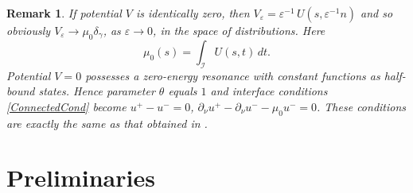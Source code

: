 \documentclass[reqno]{amsart}
\theoremstyle{plain}
\newtheorem{rem}{Remark}
\numberwithin{equation}{section}
\newcommand{\eps}{\varepsilon}
\newcommand{\cI}{\mathcal{I}}
\begin{document}
\begin{rem}
  If potential $V$ is identically zero, then $V_\eps=\eps^{-1}\,U\left(s,\eps^{-1}n\right)$ and so obviously
$V_\eps\to \mu_0 \delta_\gamma$, as $\eps\to 0$, in the space of distributions. Here
\begin{equation}\label{Mu0}
  \mu_0(s)=\int_{\cI}U(s,t)\, dt.
\end{equation}
Potential $V=0$ possesses a zero-energy resonance with constant functions as  half-bound states. Hence parameter $\theta$ equals  $1$ and interface conditions \eqref{ConnectedCond} become
$ u^+- u^-=0$,  $\partial_\nu u^+-\partial_\nu u^-
-\mu_0 u^-=0$. These conditions are exactly the same as that obtained in \cite{BehrndtExnerHolzmannLotoreichik2017}.
\end{rem}







\section{Preliminaries}
\end{document}
